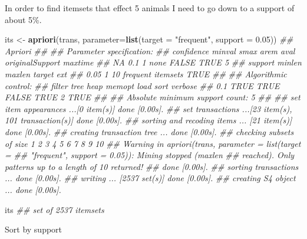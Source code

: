 \documentclass[
  notitlepage]{book}
\newenvironment{Shaded}{\begin{snugshade}}{\end{snugshade}}
\newcommand{\CommentTok}[1]{\textcolor[rgb]{0.56,0.35,0.01}{\textit{#1}}}
\newcommand{\DataTypeTok}[1]{\textcolor[rgb]{0.13,0.29,0.53}{#1}}
\newcommand{\FloatTok}[1]{\textcolor[rgb]{0.00,0.00,0.81}{#1}}
\newcommand{\KeywordTok}[1]{\textcolor[rgb]{0.13,0.29,0.53}{\textbf{#1}}}
\newcommand{\NormalTok}[1]{#1}
\newcommand{\StringTok}[1]{\textcolor[rgb]{0.31,0.60,0.02}{#1}}
\begin{document}
In order to find itemsets that effect 5 animals I need to go down to a
support of about 5\%.

\begin{Shaded}
\begin{Highlighting}[]
\NormalTok{its \textless{}{-}}\StringTok{ }\KeywordTok{apriori}\NormalTok{(trans, }\DataTypeTok{parameter=}\KeywordTok{list}\NormalTok{(}\DataTypeTok{target =} \StringTok{"frequent"}\NormalTok{, }
                                     \DataTypeTok{support =} \FloatTok{0.05}\NormalTok{))}
\CommentTok{\#\# Apriori}
\CommentTok{\#\# }
\CommentTok{\#\# Parameter specification:}
\CommentTok{\#\#  confidence minval smax arem  aval originalSupport maxtime}
\CommentTok{\#\#          NA    0.1    1 none FALSE            TRUE       5}
\CommentTok{\#\#  support minlen maxlen            target  ext}
\CommentTok{\#\#     0.05      1     10 frequent itemsets TRUE}
\CommentTok{\#\# }
\CommentTok{\#\# Algorithmic control:}
\CommentTok{\#\#  filter tree heap memopt load sort verbose}
\CommentTok{\#\#     0.1 TRUE TRUE  FALSE TRUE    2    TRUE}
\CommentTok{\#\# }
\CommentTok{\#\# Absolute minimum support count: 5 }
\CommentTok{\#\# }
\CommentTok{\#\# set item appearances ...[0 item(s)] done [0.00s].}
\CommentTok{\#\# set transactions ...[23 item(s), 101 transaction(s)] done [0.00s].}
\CommentTok{\#\# sorting and recoding items ... [21 item(s)] done [0.00s].}
\CommentTok{\#\# creating transaction tree ... done [0.00s].}
\CommentTok{\#\# checking subsets of size 1 2 3 4 5 6 7 8 9 10}
\CommentTok{\#\# Warning in apriori(trans, parameter = list(target =}
\CommentTok{\#\# "frequent", support = 0.05)): Mining stopped (maxlen}
\CommentTok{\#\# reached). Only patterns up to a length of 10 returned!}
\CommentTok{\#\#  done [0.00s].}
\CommentTok{\#\# sorting transactions ... done [0.00s].}
\CommentTok{\#\# writing ... [2537 set(s)] done [0.00s].}
\CommentTok{\#\# creating S4 object  ... done [0.00s].}
\end{Highlighting}
\end{Shaded}

\begin{Shaded}
\begin{Highlighting}[]
\NormalTok{its}
\CommentTok{\#\# set of 2537 itemsets}
\end{Highlighting}
\end{Shaded}

Sort by support
\end{document}
